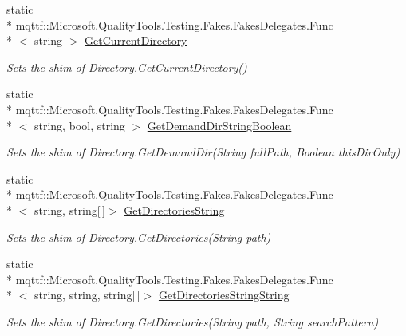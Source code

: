 \begin{DoxyCompactItemize}
static \\*
mqttf\-::\-Microsoft.\-Quality\-Tools.\-Testing.\-Fakes.\-Fakes\-Delegates.\-Func\\*
$<$ string $>$ \hyperlink{class_system_1_1_i_o_1_1_fakes_1_1_shim_directory_a6ab2a25b3fea5418567aa4477c221dd4}{Get\-Current\-Directory}
\begin{DoxyCompactList}\small\item\em Sets the shim of Directory.\-Get\-Current\-Directory()\end{DoxyCompactList}\item 
static \\*
mqttf\-::\-Microsoft.\-Quality\-Tools.\-Testing.\-Fakes.\-Fakes\-Delegates.\-Func\\*
$<$ string, bool, string $>$ \hyperlink{class_system_1_1_i_o_1_1_fakes_1_1_shim_directory_a2be23a0f6f88b70784a5ce9b7ed888e6}{Get\-Demand\-Dir\-String\-Boolean}
\begin{DoxyCompactList}\small\item\em Sets the shim of Directory.\-Get\-Demand\-Dir(\-String full\-Path, Boolean this\-Dir\-Only)\end{DoxyCompactList}\item 
static \\*
mqttf\-::\-Microsoft.\-Quality\-Tools.\-Testing.\-Fakes.\-Fakes\-Delegates.\-Func\\*
$<$ string, string\mbox{[}$\,$\mbox{]}$>$ \hyperlink{class_system_1_1_i_o_1_1_fakes_1_1_shim_directory_ac57351a4a8e6a56e5467f8d40e3feb4d}{Get\-Directories\-String}
\begin{DoxyCompactList}\small\item\em Sets the shim of Directory.\-Get\-Directories(\-String path)\end{DoxyCompactList}\item 
static \\*
mqttf\-::\-Microsoft.\-Quality\-Tools.\-Testing.\-Fakes.\-Fakes\-Delegates.\-Func\\*
$<$ string, string, string\mbox{[}$\,$\mbox{]}$>$ \hyperlink{class_system_1_1_i_o_1_1_fakes_1_1_shim_directory_ad3882a77d36a485e3fd66d9fc746f730}{Get\-Directories\-String\-String}
\begin{DoxyCompactList}\small\item\em Sets the shim of Directory.\-Get\-Directories(\-String path, String search\-Pattern)\end{DoxyCompactList}\item 

\end{DoxyCompactItemize}
